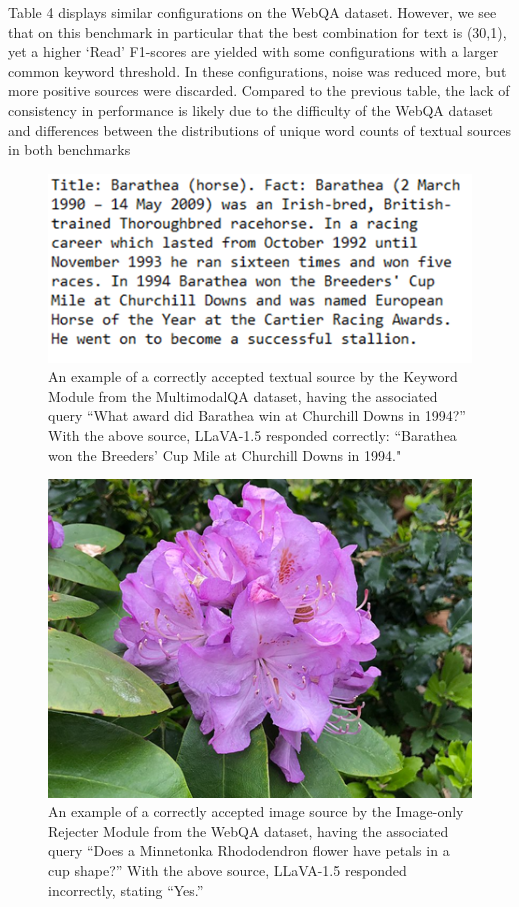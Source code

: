\documentclass[twocolumn]{article}
\begin{document}
Table 4 displays similar configurations on the WebQA dataset. However, we see that on this benchmark in particular that the best combination for text is (30,1), yet a higher ‘Read’ F1-scores are yielded with some configurations with a larger common keyword threshold. In these configurations, noise was reduced more, but more positive sources were discarded. Compared to the previous table, the lack of consistency in performance is likely due to the difficulty of the WebQA dataset and differences between the distributions of unique word counts of textual sources in both benchmarks

\begin{figure}
    \centering
    \includegraphics[width=1\linewidth]{image6.png}
    \caption{An example of a correctly accepted textual source by the Keyword Module from the MultimodalQA dataset, having the associated query “What award did Barathea win at Churchill Downs in 1994?” With the above source, LLaVA-1.5 responded correctly: “Barathea won the Breeders' Cup Mile at Churchill Downs in 1994."}
    \label{fig:enter-label}
\end{figure}

\begin{figure}
    \centering
    \includegraphics[width=1\linewidth]{image7.png}
    \caption{An example of a correctly accepted image source by the Image-only Rejecter Module from the WebQA dataset, having the associated query “Does a Minnetonka Rhododendron flower have petals in a cup shape?” With the above source, LLaVA-1.5 responded incorrectly, stating “Yes.”}
    \label{fig:enter-label}
\end{figure}
\end{document}
